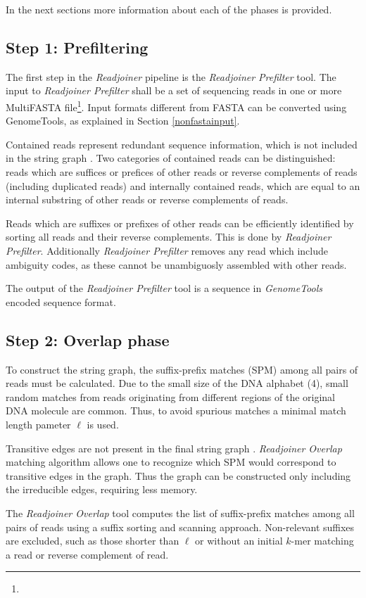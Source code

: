 \documentclass[12pt,titlepage]{article}
\newcommand{\GenomeTools}{\textit{GenomeTools}\xspace}
\newcommand{\Readjoiner}{\textit{Readjoiner}\xspace}
\newcommand{\Rdjprefilter}{\textit{Readjoiner Prefilter}\xspace}
\newcommand{\Rdjoverlap}{\textit{Readjoiner Overlap}\xspace}
\newcommand{\minlen}{\ell}
\begin{document}
In the next sections more information about each of the phases is provided.

\subsection{Step 1: Prefiltering}

The first step in the \Readjoiner pipeline is the \Rdjprefilter tool.
The input to \Rdjprefilter shall be a set of sequencing reads in
one or more MultiFASTA file\footnote{
  }.
Input formats different from FASTA can be converted using GenomeTools,
as explained in Section \ref{nonfastainput}.

Contained reads represent redundant sequence information, which is not included
in the string graph \cite{MYE:2005}. Two categories of contained
reads can be distinguished: reads which are suffices or prefices of other reads or reverse complements
of reads (including duplicated reads) and internally contained reads, which
are equal to an internal substring of other reads or reverse complements of reads.

Reads which are suffixes or prefixes of other reads can be efficiently
identified by sorting all reads
and their reverse complements. This is done by \Rdjprefilter.
Additionally \Rdjprefilter removes any read which include ambiguity codes,
as these cannot be unambiguosly assembled with other reads.

The output of the \Rdjprefilter tool is a sequence in
\GenomeTools encoded sequence format.

\subsection{Step 2: Overlap phase}

To construct the string graph, the suffix-prefix matches (SPM) among all pairs
of reads must be calculated. Due to the small size of the DNA alphabet (4),
small random matches from reads originating from different regions of the
original DNA molecule are common. Thus, to avoid spurious matches a minimal
match length pameter $\minlen$ is used.

Transitive edges are not present in the final string graph \cite{MYE:2005}.
 \Rdjoverlap matching algorithm allows one to recognize which SPM would
 correspond to transitive edges in the graph. Thus the graph can be constructed
 only including the irreducible edges, requiring less memory.

The \Rdjoverlap tool computes the list of suffix-prefix matches among
all pairs of reads using a suffix sorting and scanning approach.
Non-relevant suffixes are excluded, such as those shorter
than $\minlen$ or without an initial $k$-mer matching a read or reverse
complement of read.
\end{document}
